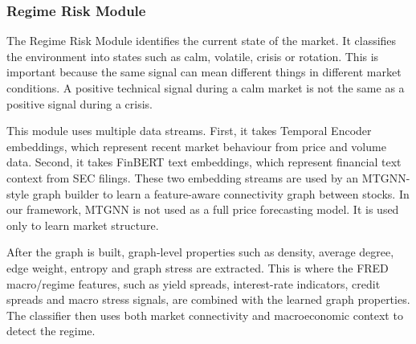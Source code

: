 \documentclass[conference]{IEEEtran}
\begin{document}
\subsubsection{Regime Risk Module}
The Regime Risk Module identifies the current state of the market. It classifies the environment into states such as calm, volatile, crisis or rotation. This is important because the same signal can mean different things in different market conditions. A positive technical signal during a calm market is not the same as a positive signal during a crisis.

This module uses multiple data streams. First, it takes Temporal Encoder embeddings, which represent recent market behaviour from price and volume data. Second, it takes FinBERT text embeddings, which represent financial text context from SEC filings. These two embedding streams are used by an MTGNN-style graph builder\cite{MTGNN} to learn a feature-aware connectivity graph between stocks. In our framework, MTGNN is not used as a full price forecasting model. It is used only to learn market structure.

After the graph is built, graph-level properties such as density, average degree, edge weight, entropy and graph stress are extracted. This is where the FRED macro/regime features, such as yield spreads, interest-rate indicators, credit spreads and macro stress signals, are combined with the learned graph properties. The classifier then uses both market connectivity and macroeconomic context to detect the regime.
\end{document}
